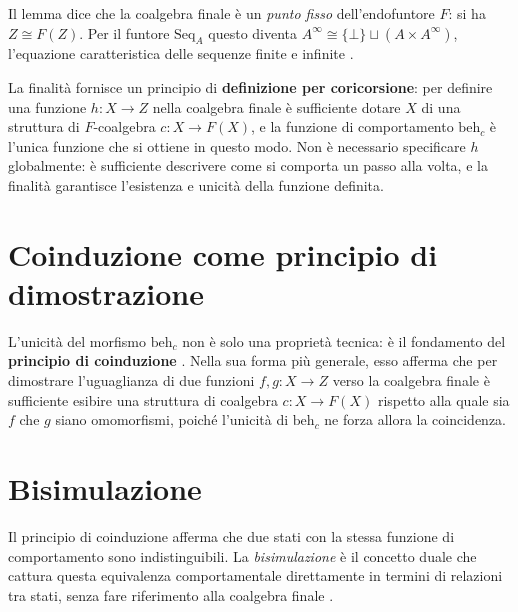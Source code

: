 Il lemma dice che la coalgebra finale è un \textit{punto fisso} dell'endofuntore \(F\): si ha \(Z \cong F(Z)\). Per il funtore \(\mathrm{Seq}_A \) questo diventa \(A^\infty \cong \{\bot\} \sqcup (A \times A^\infty)\), l'equazione caratteristica delle sequenze finite e infinite \cite{jacobs2017}.

La finalità fornisce un principio di \textbf{definizione per coricorsione}: per definire una funzione \(h : X \to Z\) nella coalgebra finale è sufficiente dotare \(X\) di una struttura di \(F\)-coalgebra \(c : X \to F(X)\), e la funzione di comportamento \(\mathrm{beh}_c\) è l'unica funzione che si ottiene in questo modo. Non è necessario specificare \(h\) globalmente: è sufficiente descrivere come si comporta un passo alla volta, e la finalità garantisce l'esistenza e unicità della funzione definita.

\section{Coinduzione come principio di dimostrazione}

L'unicità del morfismo \(\mathrm{beh}_c\) non è solo una proprietà tecnica: è il fondamento del \textbf{principio di coinduzione} \cite{jacobs2017,rutten2000}. Nella sua forma più generale, esso afferma che per dimostrare l'uguaglianza di due funzioni \(f, g : X \to Z\) verso la coalgebra finale è sufficiente esibire una struttura di coalgebra \(c : X \to F(X)\) rispetto alla quale sia \(f\) che \(g\) siano omomorfismi, poiché l'unicità di \(\mathrm{beh}_c\) ne forza allora la coincidenza.

\section{Bisimulazione}

Il principio di coinduzione afferma che due stati con la stessa funzione di comportamento sono indistinguibili. La \textit{bisimulazione} è il concetto duale che cattura questa equivalenza comportamentale direttamente in termini di relazioni tra stati, senza fare riferimento alla coalgebra finale \cite{rutten2000}.

